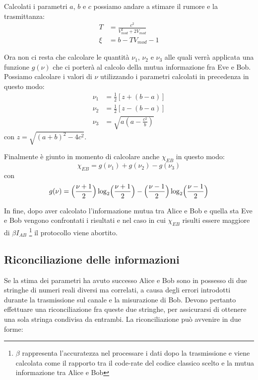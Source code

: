 Calcolati i parametri $a$, $b$ e $c$ possiamo andare a stimare il rumore e la trasmittanza:
\begin{equation}
\begin{split}
T& = \frac{c^2}{V_{mod}^2 + 2V_{mod}} \\
\xi& = b - TV_{mod} -1
\end{split}
\end{equation}

Ora non ci resta che calcolare le quantit\`a $\nu_1$, $\nu_2$ e $\nu_3$ alle quali verr\`a applicata una funzione $g(\nu)$ che ci porter\`a al calcolo della mutua informazione fra Eve e Bob. Possiamo calcolare i valori di $\nu$ utilizzando i parametri calcolati in precedenza in questo modo:
\begin{equation} \label{eq:nuCalc}
\begin{split}
\nu_1& = \frac{1}{2}[z + (b - a)] \\
\nu_2& = \frac{1}{2}[z - (b - a)] \\
\nu_3& = \sqrt{a (a - \frac{c^2}{b})}
\end{split}
\end{equation}
con $z = \sqrt{(a + b)^2 - 4 c^2}$.

Finalmente \`e giunto in momento di calcolare anche $\chi_{EB}$ in questo modo:
\begin{equation} \label{eq:EB-info}
\chi_{EB} = g(\nu_1) + g(\nu_2) - g(\nu_3)
\end{equation}
con 
\begin{equation} \label{eq:g}
g(\nu) = \Bigl (\frac{\nu + 1}{2}\Bigr ) \log_2 \Bigl (\frac{\nu + 1}{2}\Bigr ) - \Bigl (\frac{\nu - 1}{2}\Bigr ) \log_2 \Bigl (\frac{\nu - 1}{2}\Bigr )
\end{equation}

In fine, dopo aver calcolato l'informazione mutua tra Alice e Bob e quella sta Eve e Bob vengono confrontati i risultati e nel caso in cui $\chi_{EB}$ risulti essere maggiore di $\beta I_{AB}$ \footnote{$\beta$ rappresenta l'accuratezza nel processare i dati dopo la trasmissione e viene calcolata come il rapporto tra il code-rate del codice classico scelto e la mutua informazione tra Alice e Bob} il protocollo viene abortito.

\subsection{Riconciliazione delle informazioni}\label{subse:riconciliazione}
Se la stima dei parametri ha avuto successo Alice e Bob sono in possesso di due stringhe di numeri reali diversi ma correlati, a causa degli errori introdotti durante la trasmissione sul canale e la misurazione di Bob. Devono pertanto effettuare una riconciliazione fra queste due stringhe, per assicurarsi di ottenere una sola stringa condivisa da entrambi. La riconciliazione pu\`o avvenire in due forme: 


